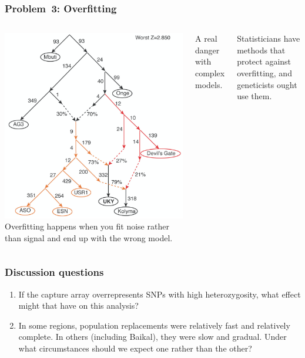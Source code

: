 \documentclass[pdftex,12pt,dvipsnames]{beamer}
\begin{document}
\begin{frame}
  \frametitle{Problem~3: Overfitting}
  \begin{columns}
    \includegraphics[width=\linewidth]{yu20-network.png}
    \raggedleft
    Overfitting happens when you fit noise rather than signal and end
    up with the wrong model.

    \bigskip

    A real danger with complex models.

    \bigskip

    Statisticians have methods that protect against
    overfitting, and geneticists ought use them.
\end{columns}    
\end{frame}

\begin{frame}
  \frametitle{Discussion questions}
  \begin{enumerate}
    \item If the capture array overrepresents SNPs with high
      heterozygosity, what effect might that have on this analysis?
    \item In some regions, population replacements were relatively
      fast and relatively complete. In others (including Baikal), they
      were slow and gradual. Under what circumstances should we expect
      one rather than the other?
  \end{enumerate}
\end{frame}
\end{document}
